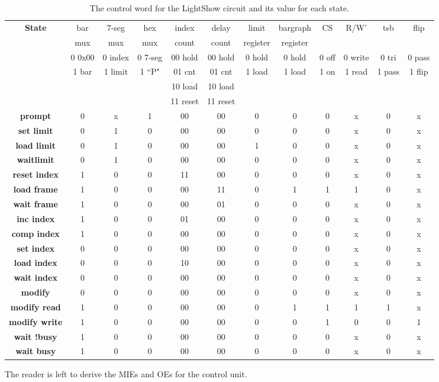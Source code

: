 \begin{table}
{\tiny
\begin{tabular}{c||c|c|c|c|c|c|c|c|c|c|c}
\textbf{ State } 	& bar & 7-seg & hex & index & delay & limit    & bargraph & CS & R/W' & tsb & flip \\  
	& mux & mux   & mux & count & count & register & register &       &       & &      \\  \hline \hline
	& 0 0x00 & 0 index & 0 7-seg & 00 hold & 00 hold & 0 hold & 0 hold & 0 off & 0 write & 0 tri & 0 pass \\ 
	& 1 bar	& 1 limit & 1 ``P"& 01 cnt & 01 cnt & 1 load &    1 load & 1 on    &  1 read & 1 pass & 1 flip \\
	& 	&     &     & 10 load & 10 load & & & & & \\
	& 	&     &	    & 11 reset	& 11 reset & & & & \\ \hline \hline
\textbf{ prompt } 	 & 	0 &	x &	1 &	00 &	00 &	0 &	0 &	0 & x &	0 & x \\ \hline
\textbf{ set limit }  & 	0 &	1 &	0 &	00 &	00 &	0 &	0 &	0 & x &	0 & x \\ \hline
\textbf{ load limit } &	0 &	1 &	0 &	00 &	00 &	1 &	0 &	0 & x &	0 & x \\ \hline
\textbf{ waitlimit } &	0 &	1 &	0 &	00 &	00 &	0 &	0 &	0 & x &	0 & x \\ \hline
\textbf{ reset index } &	1 &	0 & 	0 &	11 &	00 &	0 &	0 &	0 & x &	0 & x \\ \hline
\textbf{ load frame } &	1 &	0 &	0 &	00 &	11 &	0 &	1 &	1 & 1 & 0 & x \\ \hline
\textbf{ wait frame } &	1 &	0 &	0 &	00 &	01 &	0 &	0 &	0 & x &	0 & x \\ \hline
\textbf{ inc index } &	1 &	0 &	0 &	01 &	00 &	0 &	0 &	0 & x &	0 & x \\ \hline
\textbf{ comp index } &	1 &	0 &	0 &	00 &	00 &	0 &	0 &	0 & x &	0 & x \\ \hline
\textbf{ set index } &	0 &	0 &	0 &	00 & 	00 &	0 & 	0 &	0 & x &	0 & x \\ \hline
\textbf{ load index } &	0 &	0 & 	0 &	10 &	00 &	0 &	0 &	0 & x & 0 & x \\ \hline
\textbf{ wait index } &	0 &	0 &	0 &	00 &	00 &	0 &	0 &	0 & x &	0 & x \\ \hline
\textbf{ modify	} &	0 &	0 &	0 &	00 &	00 &	0 &	0 &	0 & x &	0 & x \\ \hline
\textbf{ modify read} &	1 &	0 &	0 &	00 &	00 &	0 &	1 &	1 & 1 &	1 & x \\ \hline
\textbf{ modify write } &	1 &	0 &	0 &	00 &	00 &	0 &	0 & 	1 & 0 &	0 & 1 \\ \hline
\textbf{ wait !busy } &	1 &	0 &	0 &	00 &	00 &	0 &	0 &	0 & x &	0 & x \\ \hline
\textbf{ wait busy } &	1 &	0 &	0 &	00 &	00 &	0 &	0 &	0 & x &	0 & x \\ 
\end{tabular} 
}
\caption{The control word for the LightShow circuit and its value for each state.}
\label{table:LightShow}
\end{table}

The reader is left to derive the MIEs and OEs for the control unit.

